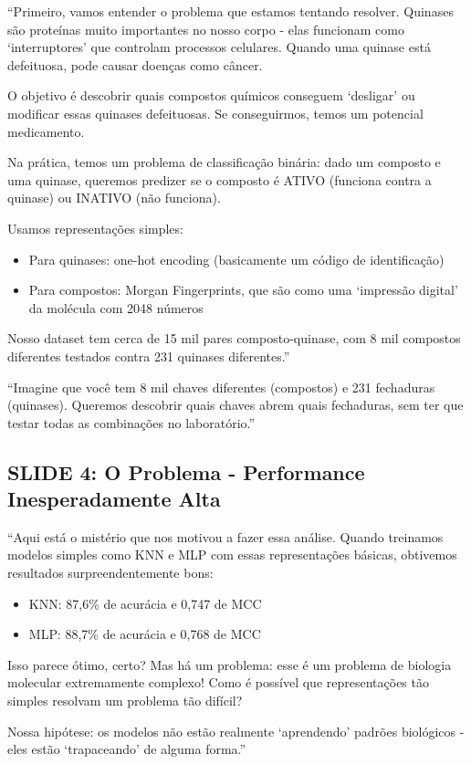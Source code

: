 \documentclass[11pt,a4paper]{article}
\begin{document}
\begin{oquedizer}
``Primeiro, vamos entender o problema que estamos tentando resolver. Quinases são proteínas muito importantes no nosso corpo - elas funcionam como `interruptores' que controlam processos celulares. Quando uma quinase está defeituosa, pode causar doenças como câncer.

O objetivo é descobrir quais compostos químicos conseguem `desligar' ou modificar essas quinases defeituosas. Se conseguirmos, temos um potencial medicamento.

Na prática, temos um problema de classificação binária: dado um composto e uma quinase, queremos predizer se o composto é ATIVO (funciona contra a quinase) ou INATIVO (não funciona).

Usamos representações simples:
\begin{itemize}
    \item Para quinases: one-hot encoding (basicamente um código de identificação)
    \item Para compostos: Morgan Fingerprints, que são como uma `impressão digital' da molécula com 2048 números
\end{itemize}

Nosso dataset tem cerca de 15 mil pares composto-quinase, com 8 mil compostos diferentes testados contra 231 quinases diferentes.''
\end{oquedizer}

\begin{analogia}
``Imagine que você tem 8 mil chaves diferentes (compostos) e 231 fechaduras (quinases). Queremos descobrir quais chaves abrem quais fechaduras, sem ter que testar todas as combinações no laboratório.''
\end{analogia}

\subsection{SLIDE 4: O Problema - Performance Inesperadamente Alta}

\begin{oquedizer}
``Aqui está o mistério que nos motivou a fazer essa análise. Quando treinamos modelos simples como KNN e MLP com essas representações básicas, obtivemos resultados surpreendentemente bons:
\begin{itemize}
    \item KNN: 87,6\% de acurácia e 0,747 de MCC
    \item MLP: 88,7\% de acurácia e 0,768 de MCC
\end{itemize}

Isso parece ótimo, certo? Mas há um problema: esse é um problema de biologia molecular extremamente complexo! Como é possível que representações tão simples resolvam um problema tão difícil?

Nossa hipótese: os modelos não estão realmente `aprendendo' padrões biológicos - eles estão `trapaceando' de alguma forma.''
\end{oquedizer}
\end{document}
